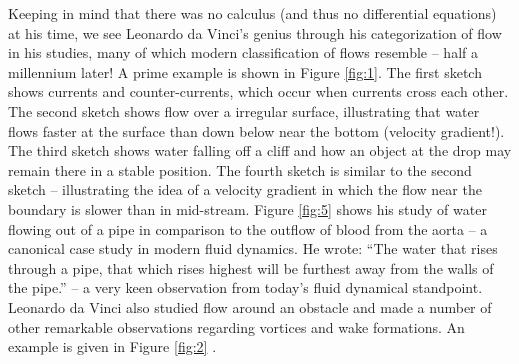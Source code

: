 \documentclass[12pt]{article}
\begin{document}
Keeping in mind that there was no calculus (and thus no differential equations) at his time, we see Leonardo da Vinci's genius through his categorization of flow in his studies, many of which modern classification of flows resemble -- half a millennium later! A prime example is shown in Figure \ref{fig:1}. The first sketch shows currents and counter-currents, which occur when currents cross each other. The second sketch shows flow over a irregular surface, illustrating that water flows faster at the surface than down below near the bottom (velocity gradient!). The third sketch shows water falling off a cliff and how an object at the drop may remain there in a stable position. The fourth sketch is similar to the second sketch -- illustrating the idea of a velocity gradient in which the flow near the boundary is slower than in mid-stream.  Figure \ref{fig:5} shows his study of water flowing out of a pipe in comparison to the outflow of blood from the aorta -- a canonical case study in modern fluid dynamics. He wrote: ``The water that rises through a pipe, that which rises highest will be furthest away from the walls of the pipe.'' -- a very keen observation from today's fluid dynamical standpoint.  Leonardo da Vinci also studied flow around an obstacle and made a number of other remarkable observations regarding vortices and wake formations. An example is given in Figure \ref{fig:2} \cite{marusic2021leonardo}. \\
\end{document}
